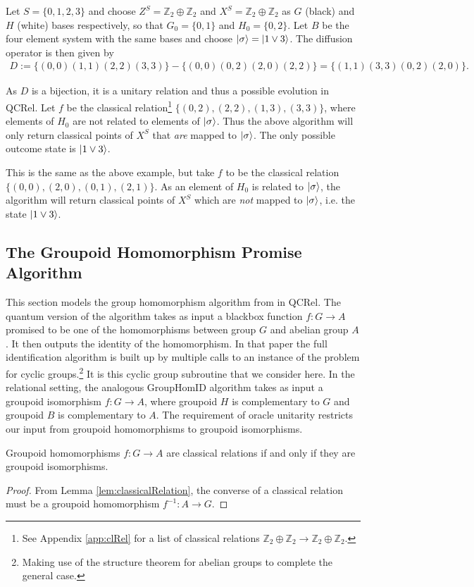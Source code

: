 \begin{example}
Let $S=\{0,1,2,3\}$ and choose $Z^S=\mathbb{Z}_2\oplus\mathbb{Z}_2$ and $X^S=\mathbb{Z}_2\oplus\mathbb{Z}_2$ as $G$ (black) and $H$ (white) bases respectively, so that $G_0=\{0,1\}$ and $H_0 = \{0,2\}$. Let $B$ be the four element system with the same bases and choose $| \sigma \rangle=| 1\vee3 \rangle$. The diffusion operator is then given by
\begin{align*}
D := \{(0,0)(1,1)(2,2)(3,3)\}-\{(0,0)(0,2)(2,0)(2,2)\}=\{(1,1)(3,3)(0,2)(2,0)\}.
\end{align*}

As $D$ is a bijection, it is a unitary relation and thus a possible evolution in QCRel. Let $f$ be the classical relation\footnote{See Appendix \ref{app:clRel} for a list of classical relations $\mathbb{Z}_2\oplus\mathbb{Z}_2\to\mathbb{Z}_2\oplus\mathbb{Z}_2$.} $\{(0,2),(2,2),(1,3),(3,3)\}$, where elements of $H_0$ are not related to elements of $| \sigma \rangle$. Thus the above algorithm will only return classical points of $X^{S}$ that \textit{are} mapped to $| \sigma \rangle$.  The only possible outcome state is $| 1\vee 3 \rangle$.
\end{example}

\begin{example}
This is the same as the above example, but take $f$ to be the classical relation $\{(0,0),(2,0),(0,1),(2,1)\}$. As an element of $H_0$ is related to $| \sigma \rangle$, the algorithm will return classical points of $X^S$ which are \emph{not} mapped to $| \sigma \rangle$, i.e. the state $| 1\vee3 \rangle$.
\end{example}

\subsection{The Groupoid Homomorphism Promise Algorithm}

This section models the group homomorphism algorithm from \cite{zeng2014abstract} in QCRel.  The quantum version of the algorithm takes as input a blackbox function $f:G\to A$ promised to be one of the homomorphisms between group $G$ and abelian group $A$.  It then outputs the identity of the homomorphism. In that paper the full identification algorithm is built up by multiple calls to an instance of the problem for cyclic groups.\footnote{Making use of the structure theorem for abelian groups to complete the general case.} It is this cyclic group subroutine that we consider here. In the relational setting, the analogous GroupHomID algorithm takes as input a groupoid isomorphism $f:G\to A$, where groupoid $H$ is complementary to $G$ and groupoid $B$ is complementary to $A$.  The requirement of oracle unitarity restricts our input from groupoid homomorphisms to groupoid isomorphisms.
\begin{corollary}
Groupoid homomorphisms $f:G\to A$ are classical relations if and only if they are groupoid isomorphisms.
\end{corollary}
\begin{proof}
From Lemma \ref{lem:classicalRelation}, the converse of a classical relation must be a groupoid homomorphism $f^{-1}:A\to G$.
\end{proof}


